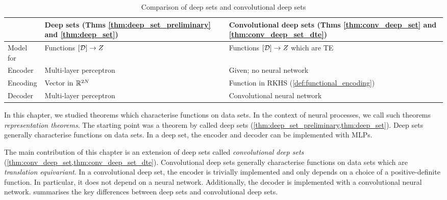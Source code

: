 \documentclass[12pt, twoside]{report}
\begin{document}
\begin{table}[t]
    \centering
    \caption{
        Comparison of deep sets and convolutional deep sets
    }
    \label{tab:comparison_deep_sets}
    \small
    \begin{tabular}{lll}
        \toprule
        ~
            & Deep sets (Thms \ref{thm:deep_set_preliminary} and \ref{thm:deep_set})
            & Convolutional deep sets (Thms \ref{thm:conv_deep_set} and \ref{thm:conv_deep_set_dte}) \\ \midrule
        Model for
            & Functions $[\mathcal{D}] \to Z$
            & Functions $[\mathcal{D}] \to Z$ which are TE \\
        Encoder
            & Multi-layer perceptron
            & Given; no neural network \\
        Encoding
            & Vector in $\mathbb{R}^{2N}$
            & Function in RKHS (\cref{def:functional_encoding}) \\
        Decoder
            & Multi-layer perceptron
            & Convolutional neural network \\
        \bottomrule
    \end{tabular}
\end{table}

In this chapter, we studied theorems which characterise functions on data sets.
In the context of neural processes, we call such theorems \emph{representation theorems}.
The starting point was a theorem by \textcite{Zaheer:2017:Deep_Sets,Wagstaff:2019:On_the_Limitations_of_Representing} called deep sets (\cref{thm:deep_set_preliminary,thm:deep_set}).
Deep sets generally characterise functions on data sets.
In a deep set, the encoder and decoder can be implemented with MLPs.

The main contribution of this chapter is an extension of deep sets called \emph{convolutional deep sets} (\cref{thm:conv_deep_set,thm:conv_deep_set_dte}).
Convolutional deep sets generally characterise functions on data sets which are \emph{translation equivariant}.
In a convolutional deep set, the encoder is trivially implemented and only depends on a choice of a positive-definite function.
In particular, it does not depend on a neural network.
Additionally, the decoder is implemented with a convolutional neural network.
 summarises the key differences between deep sets and convolutional deep sets.
\end{document}

